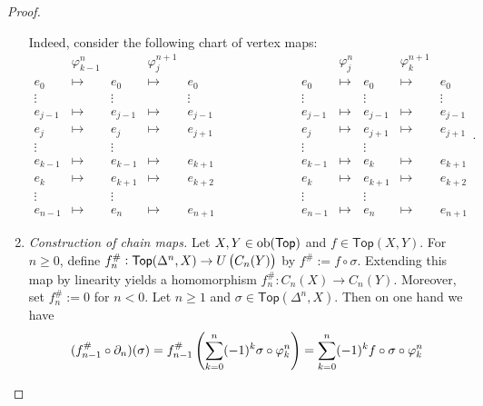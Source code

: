 \begin{proof}
\begin{enumerate}[label = \textit{Step \arabic*:},wide = 0pt, itemsep = 1.5ex]
			Indeed, consider the following chart of vertex maps:
			\begin{equation*}
				\begin{matrix}
					& \varphi_{k - 1}^n & & \varphi_j^{n + 1}\\
					e_0 & \mapsto & e_0 & \mapsto & e_0\\
					\vdots & & \vdots & & \vdots\\
					e_{j - 1} & \mapsto & e_{j - 1} & \mapsto & e_{j - 1}\\
					e_j & \mapsto & e_j & \mapsto & e_{j + 1}\\
					\vdots & & \vdots\\
					e_{k - 1} & \mapsto & e_{k - 1} & \mapsto & e_{k + 1}\\
					e_k & \mapsto & e_{k + 1} & \mapsto & e_{k + 2}\\
					\vdots & & \vdots\\
					e_{n - 1} & \mapsto & e_n & \mapsto & e_{n + 1}
				\end{matrix}
				\qquad\qquad\qquad
				\begin{matrix}
					& \varphi_j^n & & \varphi_k^{n + 1}\\
					e_0 & \mapsto & e_0 & \mapsto & e_0\\
					\vdots & & \vdots & & \vdots\\
					e_{j - 1} & \mapsto & e_{j - 1} & \mapsto & e_{j - 1}\\
					e_j & \mapsto & e_{j + 1} & \mapsto & e_{j + 1}\\
					\vdots & & \vdots\\
					e_{k - 1} & \mapsto & e_k & \mapsto & e_{k + 1}\\
					e_k & \mapsto & e_{k + 1} & \mapsto & e_{k + 2}\\
					\vdots & & \vdots\\
					e_{n - 1} & \mapsto & e_n & \mapsto & e_{n + 1}
				\end{matrix}.
			\end{equation*}
		\item \textit{Construction of chain maps.} Let $X,Y \in \operatorname{ob}(\mathsf{Top})$ and $f \in \mathsf{Top}(X,Y)$. For $n \geq 0$, define $f_n^\# : \mathsf{Top}(\Delta^n,X) \to U\del[1]{C_n(Y)}$ by $f^\# := f \circ \sigma$. Extending this map by linearity yields a homomorphism $f_n^\# : C_n(X) \to C_n(Y)$. Moreover, set $f_n^\# := 0$ for $n < 0$. Let $n \geq 1$ and $\sigma \in \mathsf{Top}(\Delta^n,X)$. Then on one hand we have
			\begin{equation*}
				(f_{n - 1}^\# \circ \partial_n)(\sigma) = f^\#_{n - 1}\del[4]{\sum_{k = 0}^n (-1)^k \sigma \circ \varphi^n_k} = \sum_{k = 0}^n (-1)^k f \circ \sigma \circ \varphi^n_k

\end{equation*}
\end{enumerate}
\end{proof}
